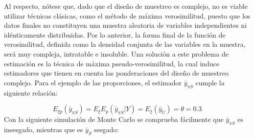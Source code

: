 \documentclass[
  12pt,
]{book}
\begin{document}
Al respecto, nótese que, dado que el diseño de muestreo es complejo, no es viable utilizar técnicas clásicas, como el método de máxima verosimilitud, puesto que los datos finales no constituyen una muestra aleatoria de variables independientes ni idénticamente distribuidas. Por lo anterior, la forma final de la función de verosimilitud, definida como la densidad conjunta de las variables en la muestra, será muy compleja, intratable e insoluble. Una solución a este problema de estimación es la técnica de máxima pseudo-verosimilitud, la cual induce estimadores que tienen en cuenta las ponderaciones del diseño de muestreo complejo. Para el ejemplo de las proporciones, el estimador \(\bar{y}_{\pi S}\) cumple la siguiente relación:

\[
E_{\xi p}(\bar{y}_{\pi S})=E_{\xi}E_{p}(\bar{y}_{\pi S}|Y)=E_{\xi}(\bar{y}_{U})=\theta=0.3
\]
Con la siguiente simulación de Monte Carlo se comprueba fácilmente que \(\bar{y}_{\pi S}\) es insesgado, mientras que es \(\bar{y}_{S}\) sesgado:
\end{document}
